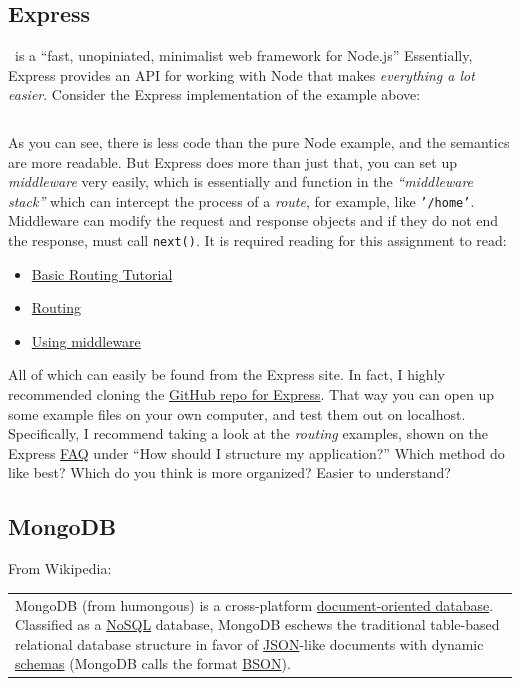 \subsection{Express}

\ExpressJS\ is a ``fast, unopiniated, minimalist web framework for Node.js''
Essentially, Express provides an API for working with Node that makes
\textit{everything a lot easier}. Consider the Express implementation of the 
example above:

\inputminted{js}{files/express/hw.js}

As you can see, there is less code than the pure Node example, and the semantics
are more readable. But Express does more than just that, you can set up 
\textit{middleware} very easily, which is essentially and function in the
\textit{``middleware stack''} which can intercept the process of a \textit{route},
for example, like \texttt{'/home'}. Middleware can modify the request and response
objects and if they do not end the response, must call \texttt{next()}. 
It is required reading for this assignment to read:

\begin{itemize}
    \item \href{http://expressjs.com/starter/basic-routing.html}{Basic Routing Tutorial}
    \item \href{http://expressjs.com/guide/routing.html}{Routing}
    \item \href{http://expressjs.com/guide/using-middleware.html}{Using middleware}
\end{itemize}

All of which can easily be found from the Express site. In fact, I highly recommended
cloning the \href{https://github.com/strongloop/express}{GitHub repo for Express}.
That way you can open up some example files on your own computer, and test them out on
localhost. Specifically, I recommend taking a look at the \textit{routing} examples, shown
on the Express \href{http://expressjs.com/starter/faq.html}{FAQ} under ``How should I structure
my application?'' Which method do like best? Which do you think is more organized? Easier to 
understand?

\subsection{MongoDB}

From Wikipedia:

\begin{tabular}{p{}} 
    MongoDB (from humongous) is a cross-platform \href{http://en.wikipedia.org/wiki/Document-oriented_database}{document-oriented database}.
    Classified as a \href{http://en.wikipedia.org/wiki/NoSQL}{NoSQL} database, 
    MongoDB eschews the traditional table-based relational database structure 
    in favor of \href{http://en.wikipedia.org/wiki/JSON}{JSON}-like documents 
    with dynamic \href{http://en.wikipedia.org/wiki/Database_schema}{schemas} 
    (MongoDB calls the format \href{http://en.wikipedia.org/wiki/BSON}{BSON}).
\end{tabular}\\

